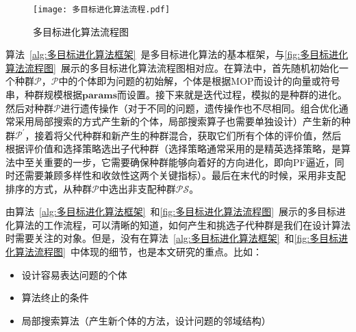 \par
\begin{figure}[htb]
    \texttt{[image: 多目标进化算法流程.pdf]}
    \caption{多目标进化算法流程图}
    \label{fig:多目标进化算法流程图}
\end{figure}
\par
算法~\ref{alg:多目标进化算法框架}~是多目标进化算法的基本框架，与\autoref{fig:多目标进化算法流程图}~展示的多目标进化算法流程图相对应。在算法中，首先随机初始化一个种群$\mathcal{P}$，$\mathcal{P}$中的个体即为问题的初始解，个体是根据MOP而设计的向量或符号串，种群规模根据$\mathbf{params}$而设置。接下来就是迭代过程，模拟的是种群的进化。然后对种群$\mathcal{P}$进行遗传操作（对于不同的问题，遗传操作也不尽相同。组合优化通常采用局部搜索的方式产生新的个体，局部搜索算子也需要单独设计）产生新的种群$\mathcal{P}^{'}$，接着将父代种群和新产生的种群混合，获取它们所有个体的评价值，然后根据评价值和选择策略选出子代种群（选择策略通常采用的是精英选择策略，是算法中至关重要的一步，它需要确保种群能够向着好的方向进化，即向PF逼近，同时还需要兼顾多样性和收敛性这两个关键指标）。最后在末代的时候，采用非支配排序的方式，从种群$\mathcal{P}$中选出非支配种群$\mathcal{PS}$。
\par
由算法~\ref{alg:多目标进化算法框架}~和\autoref{fig:多目标进化算法流程图}~展示的多目标进化算法的工作流程，可以清晰的知道，如何产生和挑选子代种群是我们在设计算法时需要关注的对象。但是，没有在算法~\ref{alg:多目标进化算法框架}~和\autoref{fig:多目标进化算法流程图}~中体现的细节，也是本文研究的重点。比如：
\begin{itemize}
    \item 设计容易表达问题的个体
    \item 算法终止的条件
    \item 局部搜索算法（产生新个体的方法，设计问题的邻域结构）
\end{itemize}

